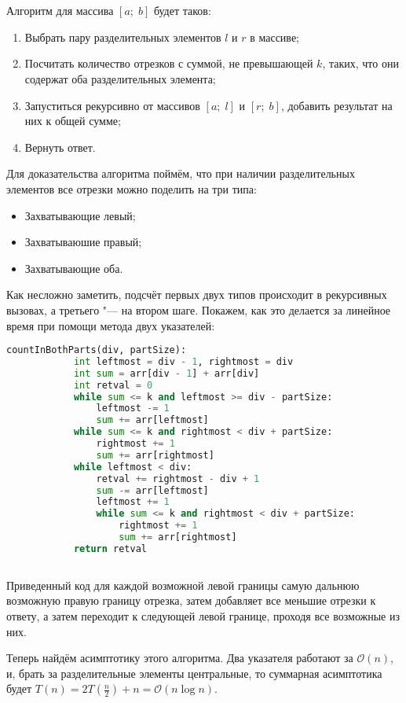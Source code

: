 \section{}

	Алгоритм для массива $[a;\;b]$ будет таков:
	\begin{enumerate}
		\item Выбрать пару разделительных элементов $l$ и $r$ в массиве;
		\item Посчитать количество отрезков с суммой, не превышающей $k$, таких, что они содержат оба разделительных элемента;
		\item Запуститься рекурсивно от массивов $[a;\;l]$ и $[r;\;b]$, добавить результат на них к общей сумме;
		\item Вернуть ответ. 
	\end{enumerate}

	Для доказательства алгоритма поймём, что при наличии разделительных элементов все отрезки можно поделить на три типа:
	\begin{itemize}
		\item Захватывающие левый;
		\item Захватываюшие правый;
		\item Захватывающие оба.
	\end{itemize}
	Как несложно заметить, подсчёт первых двух типов происходит в рекурсивных вызовах, а третьего "--- на втором шаге. Покажем, как это делается за линейное время при помощи метода двух указателей:

	\begin{lstlisting}[language=Python]
		countInBothParts(div, partSize):
			int leftmost = div - 1, rightmost = div
			int sum = arr[div - 1] + arr[div]
			int retval = 0
			while sum <= k and leftmost >= div - partSize:
				leftmost -= 1
				sum += arr[leftmost]
			while sum <= k and rightmost < div + partSize:
				rightmost += 1
				sum += arr[rightmost]
			while leftmost < div:
				retval += rightmost - div + 1
				sum -= arr[leftmost]
				leftmost += 1
				while sum <= k and rightmost < div + partSize:
					rightmost += 1
					sum += arr[rightmost]
			return retval
				
	\end{lstlisting}
	
	Приведенный код для каждой возможной левой границы самую дальнюю возможную правую границу отрезка, затем добавляет все меньшие отрезки к ответу, а затем переходит к следующей левой границе, проходя все возможные из них.
	
	Теперь найдём асимптотику этого алгоритма. Два указателя работают за $\mathcal{O}(n)$, и, брать за разделительные элементы центральные, то суммарная асимптотика будет $T(n) = 2T(\frac{n}{2}) + n = \mathcal{O}(n\log n)$.
	
